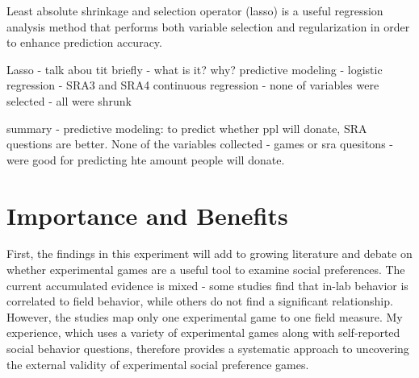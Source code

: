 \documentclass[12pt]{article}
\begin{document}
Least absolute shrinkage and selection operator (lasso) is a useful regression analysis method that performs both variable selection and regularization in order to enhance prediction accuracy. 


Lasso - talk abou tit briefly - what is it? why? predictive modeling - logistic regression - SRA3 and SRA4
continuous regression - none of variables were selected - all were shrunk

summary - predictive modeling: to predict whether ppl will donate, SRA questions are better. None of the variables collected - games or sra quesitons - were good for predicting hte amount people will donate.


%


\section{Importance and Benefits}

First, the findings in this experiment will add to growing literature and debate on whether experimental games are a useful tool to examine social preferences. The current accumulated evidence is mixed - some studies find that in-lab behavior is correlated to field behavior, while others do not find a significant relationship. However, the studies map only one experimental game to one field measure. My experience, which uses a variety of experimental games along with self-reported social behavior questions, therefore provides a systematic approach to uncovering the external validity of experimental social preference games. 
\end{document}
